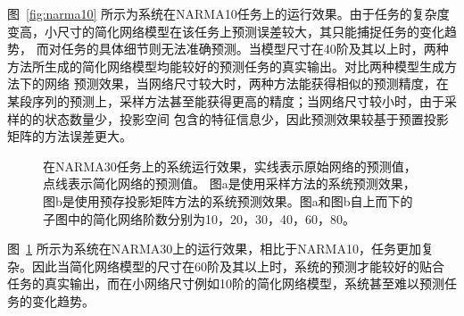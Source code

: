 图~\ref{fig:narma10} 所示为系统在NARMA10任务上的运行效果。由于任务的复杂度变高，小尺寸的简化网络模型在该任务上预测误差较大，其只能捕捉任务的变化趋势，
而对任务的具体细节则无法准确预测。当模型尺寸在40阶及其以上时，两种方法所生成的简化网络模型均能较好的预测任务的真实输出。对比两种模型生成方法下的网络
预测效果，当网络尺寸较大时，两种方法能获得相似的预测精度，在某段序列的预测上，采样方法甚至能获得更高的精度；当网络尺寸较小时，由于采样的的状态数量少，投影空间
包含的特征信息少，因此预测效果较基于预置投影矩阵的方法误差更大。
\begin{figure}[htb]
	\centering
	\caption{在NARMA30任务上的系统运行效果，实线表示原始网络的预测值，点线表示简化网络的预测值。
		图a是使用采样方法的系统预测效果，图b是使用预存投影矩阵方法的系统预测效果。图a和图b自上而下的子图中的简化网络阶数分别为10，20，30，40，60，80。}
	\label{fig:narma30}
\end{figure}

图~\ref{fig:narma30} 所示为系统在NARMA30上的运行效果，相比于NARMA10，任务更加复杂。因此当简化网络模型的尺寸在60阶及其以上时，系统的预测才能较好的贴合
任务的真实输出，而在小网络尺寸例如10阶的简化网络模型，系统甚至难以预测任务的变化趋势。

